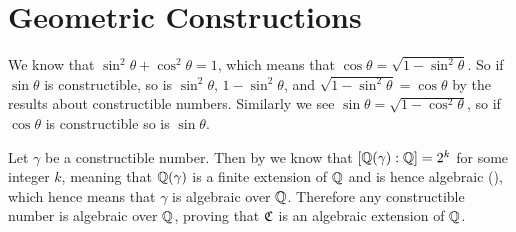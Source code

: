 \section{Geometric Constructions}
\begin{questions}
    \item We know that $\sin^2\theta + \cos^2\theta = 1$, which means that $\cos\theta = \sqrt{1-\sin^2\theta}$. So if $\sin\theta$ is constructible, so is $\sin^2\theta$, $1 - \sin^2\theta$, and $\sqrt{1-\sin^2\theta} = \cos\theta$ by the results about constructible numbers. Similarly we see $\sin\theta = \sqrt{1-\cos^2\theta}$, so if $\cos\theta$ is constructible so is $\sin\theta$.
    
    \item Let $\gamma$ be a constructible number. Then by  we know that $[\mathbb{Q}(\gamma):\mathbb{Q}] = 2^k$ for some integer $k$, meaning that $\mathbb{Q}(\gamma)$ is a finite extension of $\mathbb{Q}$ and is hence algebraic (), which hence means that $\gamma$ is algebraic over $\mathbb{Q}$. Therefore any constructible number is algebraic over $\mathbb{Q}$, proving that $\mathfrak{C}$ is an algebraic extension of $\mathbb{Q}$.
\end{questions}
